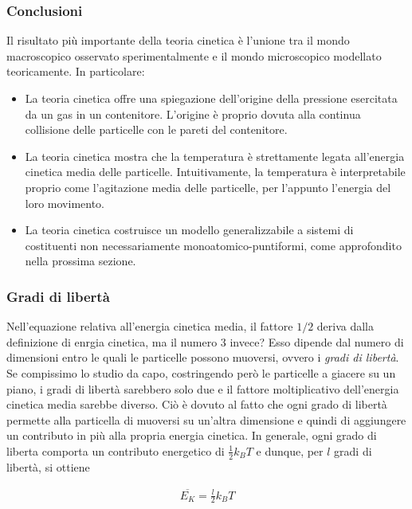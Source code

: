 \subsubsection*{Conclusioni}
Il risultato più importante della teoria cinetica è l'unione tra
il mondo macroscopico osservato sperimentalmente e il mondo microscopico
modellato teoricamente. In particolare:
\begin{itemize}
    \item La teoria cinetica offre una spiegazione dell'origine della
    pressione esercitata da un gas in un contenitore. L'origine è proprio
    dovuta alla continua collisione delle particelle con le pareti
    del contenitore.

    \item La teoria cinetica mostra che la temperatura è strettamente
    legata all'energia cinetica media delle particelle. Intuitivamente,
    la temperatura è interpretabile proprio come l'agitazione media
    delle particelle, per l'appunto l'energia del loro movimento.

    \item La teoria cinetica costruisce un modello generalizzabile
    a sistemi di costituenti non necessariamente monoatomico-puntiformi,
    come approfondito nella prossima sezione.
\end{itemize}

\subsubsection*{Gradi di libertà}
Nell'equazione relativa all'energia cinetica media,
il fattore $1/2$ deriva dalla definizione di enrgia cinetica, ma
il numero $3$ invece? Esso dipende dal numero di dimensioni entro
le quali le particelle possono muoversi, ovvero i \textit{gradi di
libertà}. Se compissimo lo studio da capo, costringendo però le particelle
a giacere su un piano, i gradi di libertà sarebbero solo due e il fattore
moltiplicativo
dell'energia cinetica media sarebbe diverso. Ciò è dovuto al fatto
che ogni grado di libertà permette alla particella di muoversi su
un'altra dimensione e quindi di aggiungere un contributo in più alla
propria energia cinetica. In generale, ogni grado di
liberta comporta un contributo energetico di $\frac12k_BT$ e
dunque, per $l$ gradi di libertà, si ottiene

\begin{align}
    \overline{E_K} = \frac{l}{2}k_BT
\end{align}


